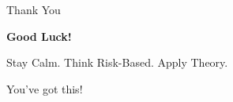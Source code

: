 \documentclass{beamer}
\begin{document}
\begin{frame}{Thank You}
\begin{center}
\Huge{\textbf{Good Luck!}}
\vspace{1cm}

\Large{Stay Calm. Think Risk-Based. Apply Theory.}
\vspace{0.5cm}

\normalsize{You've got this!}
\end{center}
\end{frame}
\end{document}
